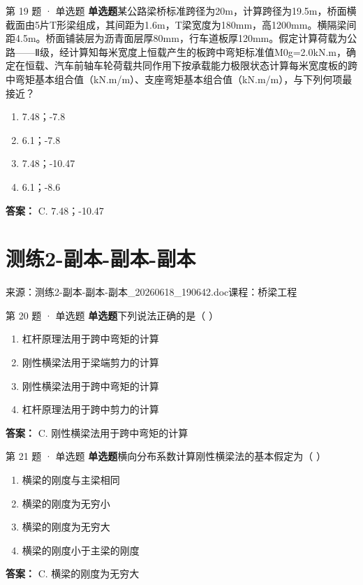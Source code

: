 \documentclass[UTF8,zihao=-4,openany]{ctexbook}
\newenvironment{choices}{\begin{enumerate}[label=\Alph*.,leftmargin=9mm,labelsep=3mm,itemsep=2pt,topsep=4pt]}{\end{enumerate}}
\newcommand{\qtype}[1]{\textcolor{brand}{\sffamily\bfseries #1}}
\newcommand{\sourcefile}[1]{\textcolor{muted}{\small\sffamily 来源：#1}}
\begin{document}
\begin{questionbox}{第 19 题 · 单选题}
\qtype{单选题}\quad 某公路梁桥标准跨径为20m，计算跨径为19.5m，桥面横截面由5片T形梁组成，其间距为1.6m，T梁宽度为180mm，高1200mm。横隔梁间距4.5m。桥面铺装层为沥青面层厚80mm，行车道板厚120mm。假定计算荷载为公路——Ⅱ级，经计算知每米宽度上恒载产生的板跨中弯矩标准值M0g=2.0kN.m，确定在恒载、汽车前轴车轮荷载共同作用下按承载能力极限状态计算每米宽度板的跨中弯矩基本组合值（kN.m/m）、支座弯矩基本组合值（kN.m/m），与下列何项最接近？
\begin{choices}
\item 7.48；-7.8
\item 6.1；-7.8
\item 7.48；-10.47
\item 6.1；-8.6
\end{choices}
\begin{answerbox}
\textbf{答案：} C. 7.48；-10.47
\end{answerbox}
\end{questionbox}

\chapter{测练2-副本-副本-副本}

\sourcefile{测练2-副本-副本-副本\_20260618\_190642.doc}\quad \textcolor{muted}{\small\sffamily 课程：桥梁工程}

\begin{questionbox}{第 20 题 · 单选题}
\qtype{单选题}\quad 下列说法正确的是（ ）
\begin{choices}
\item 杠杆原理法用于跨中弯矩的计算
\item 刚性横梁法用于梁端剪力的计算
\item 刚性横梁法用于跨中弯矩的计算
\item 杠杆原理法用于跨中剪力的计算
\end{choices}
\begin{answerbox}
\textbf{答案：} C. 刚性横梁法用于跨中弯矩的计算
\end{answerbox}
\end{questionbox}

\begin{questionbox}{第 21 题 · 单选题}
\qtype{单选题}\quad 横向分布系数计算刚性横梁法的基本假定为（ ）
\begin{choices}
\item 横梁的刚度与主梁相同
\item 横梁的刚度为无穷小
\item 横梁的刚度为无穷大
\item 横梁的刚度小于主梁的刚度
\end{choices}
\begin{answerbox}
\textbf{答案：} C. 横梁的刚度为无穷大
\end{answerbox}
\end{questionbox}
\end{document}
